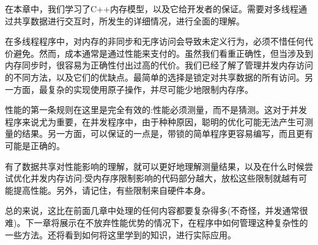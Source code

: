 在本章中，我们学习了C++内存模型，以及它给开发者的保证。需要对多线程通过共享数据进行交互时，所发生的详细情况，进行全面的理解。

在多线程程序中，对内存的非同步和无序访问会导致未定义行为，必须不惜任何代价避免。然而，成本通常是通过性能来支付的。虽然我们看重正确性，但当涉及到内存同步时，很容易为正确性付出过高的代价。我们已经了解了管理并发内存访问的不同方法，以及它们的优缺点。最简单的选择是锁定对共享数据的所有访问。另一方面，最复杂的实现使用原子操作，并尽可能少地限制内存序。

性能的第一条规则在这里是完全有效的:性能必须测量，而不是猜测。这对于并发程序来说尤为重要，在并发程序中，由于种种原因，聪明的优化可能无法产生可测量的结果。另一方面，可以保证的一点是，带锁的简单程序更容易编写，而且更有可能是正确的。

有了数据共享对性能影响的理解，就可以更好地理解测量结果，以及在什么时候尝试优化并发内存访问:受内存序限制影响的代码部分越大，放松这些限制就越有可能提高性能。另外，请记住，有些限制来自硬件本身。

总的来说，这比在前面几章中处理的任何内容都要复杂得多(不奇怪，并发通常很难)。下一章将展示在不放弃性能优势的情况下，在程序中如何管理这种复杂性的一些方法。还将看到如何将这里学到的知识，进行实际应用。





